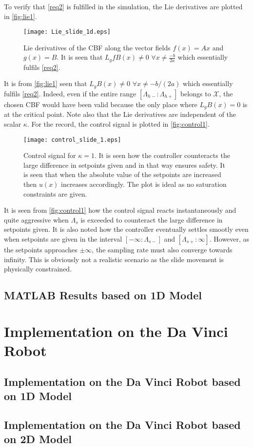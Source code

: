 To verify that \autoref{req2} is fulfilled in the simulation, the Lie derivatives are plotted in \autoref{fig:lie1}.
\begin{figure}[H]
	\center
		\texttt{[image: Lie\_slide\_1d.eps]}
	\caption{Lie derivatives of the CBF along the vector fields $f(x) = Ax$ and $g(x)=B$. It is seen that $L_gfB(x) \neq 0 \,\, \forall x \neq \frac{-b}{2a}$ which essentially fulfils \autoref{req2}.}
	\label{fig:lie1}
\end{figure}
It is from \autoref{fig:lie1} seen that $L_gB(x) \neq 0 \,\, \forall x \neq -b/(2a)$ which essentially fulfils \autoref{req2}. Indeed, even if the entire range $[\Lambda_{h-}:\Lambda_{h+}]$ belongs to $\mathcal{X}$, the chosen CBF would have been valid because the only place where $L_gB(x) = 0$ is at the critical point. Note also that the Lie derivatives are independent of the scalar $\kappa$.
For the record, the control signal is plotted in \autoref{fig:control1}.
\begin{figure}[H]
	\center
		\texttt{[image: control\_slide\_1.eps]}
	\caption{Control signal for $\kappa=1$. It is seen how the controller counteracts the large difference in setpoints given and in that way ensures safety. It is seen that when the absolute value of the setpoints are increased then $u(x)$ increases accordingly. The plot is ideal as no saturation constraints are given.}
	\label{fig:control1}
\end{figure}
It is seen from \autoref{fig:control1} how the control signal reacts instantaneously and quite aggressive when $\Lambda_s$ is exceeded to counteract the large difference in setpoints given. It is also noted how the controller eventually settles smootly even when setpoints are given in the interval $[-\infty:\Lambda_{s-}]$ and $[\Lambda_{s+}:\infty]$. However, as the setpoints approaches $\pm \infty$, the sampling rate must also converge towards infinity. This is obviously not a realistic scenario as the slide movement is physically constrained.
\subsection{MATLAB Results based on 1D Model}

\section{Implementation on the Da Vinci Robot}
\subsection{Implementation on the Da Vinci Robot based on 1D Model}

\subsection{Implementation on the Da Vinci Robot based on 2D Model}
